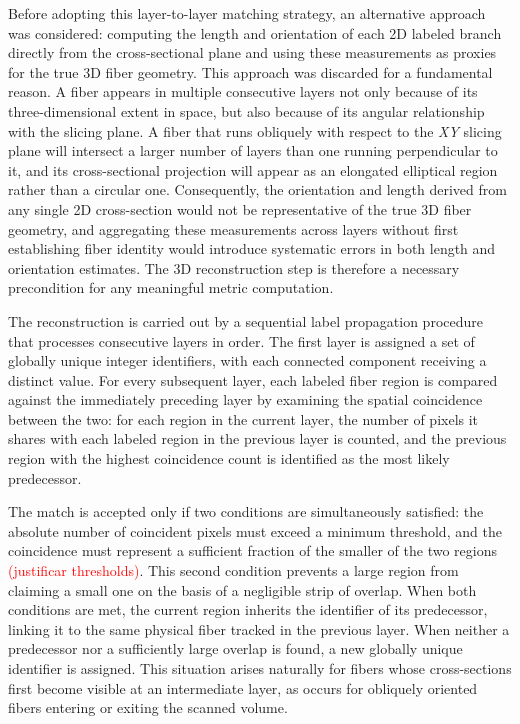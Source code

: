Before adopting this layer-to-layer matching strategy, an alternative approach was considered: computing the length and orientation of each 2D labeled branch directly from the cross-sectional plane and using these measurements as proxies for the true 3D fiber geometry. This approach was discarded for a fundamental reason. A fiber appears in multiple consecutive layers not only because of its three-dimensional extent in space, but also because of its angular relationship with the slicing plane. A fiber that runs obliquely with respect to the \textit{XY} slicing plane will intersect a larger number of layers than one running perpendicular to it, and its cross-sectional projection will appear as an elongated elliptical region rather than a circular one. Consequently, the orientation and length derived from any single 2D cross-section would not be representative of the true 3D fiber geometry, and aggregating these measurements across layers without first establishing fiber identity would introduce systematic errors in both length and orientation estimates. The 3D reconstruction step is therefore a necessary precondition for any meaningful metric computation.

The reconstruction is carried out by a sequential label propagation procedure that processes consecutive layers in order. The first layer is assigned a set of globally unique integer identifiers, with each connected component receiving a distinct value. For every subsequent layer, each labeled fiber region is compared against the immediately preceding layer by examining the spatial coincidence between the two: for each region in the current layer, the number of pixels it shares with each labeled region in the previous layer is counted, and the previous region with the highest coincidence count is identified as the most likely predecessor.

The match is accepted only if two conditions are simultaneously satisfied: the absolute number of coincident pixels must exceed a minimum threshold, and the coincidence must represent a sufficient fraction of the smaller of the two regions \textcolor{red}{(justificar thresholds)}. This second condition prevents a large region from claiming a small one on the basis of a negligible strip of overlap. When both conditions are met, the current region inherits the identifier of its predecessor, linking it to the same physical fiber tracked in the previous layer. When neither a predecessor nor a sufficiently large overlap is found, a new globally unique identifier is assigned. This situation arises naturally for fibers whose cross-sections first become visible at an intermediate layer, as occurs for obliquely oriented fibers entering or exiting the scanned volume.

